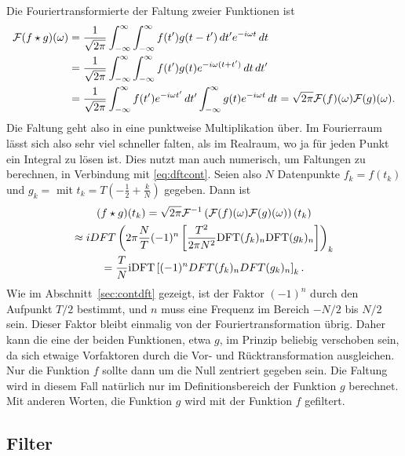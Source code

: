 Die Fouriertransformierte der Faltung zweier Funktionen ist
\begin{equation}
  \label{eq:fourierfaltung}
  \begin{split}
    \mathcal F(f\star g)(\omega) &=
    \frac{1}{\sqrt{2\pi}}\int_{-\infty}^{\infty}
    \int_{-\infty}^{\infty} f(t')g(t-t')\,dt' e^{-i \omega t}\,
    dt\\
    &= \frac{1}{\sqrt{2\pi}}\int_{-\infty}^{\infty}
    \int_{-\infty}^{\infty} f(t') g(t) e^{-i \omega (t+t')}\, dt\,
    dt'\\
    &= \frac{1}{\sqrt{2\pi}} \int_{-\infty}^{\infty} f(t')e^{-i
      \omega t'}\, dt' \int_{-\infty}^{\infty} g(t) e^{-i \omega
      t}\, dt = \sqrt{2\pi}\mathcal F(f)(\omega)\mathcal F(g)(\omega).
  \end{split}
\end{equation}
Die Faltung geht also in eine punktweise Multiplikation über. Im
Fourierraum lässt sich also sehr viel schneller falten, als im
Realraum, wo ja für jeden Punkt ein Integral zu lösen ist. Dies nutzt
man auch numerisch, um Faltungen zu berechnen, in Verbindung mit
\eqref{eq:dftcont}. Seien also $N$ Datenpunkte $f_k = f(t_k)$ und $g_k
= $ mit $t_k = T\left(-\frac{1}{2} + \frac{k}{N}\right)$ gegeben. Dann
ist
\begin{multline}
  \label{eq:discretefold}
  (f\star g)(t_k) =
  \sqrt{2\pi}\mathcal F^{-1}\left(\mathcal F(f)(\omega)\mathcal F(g)(\omega)\right)(t_k)\\
  \approx
  iDFT\left(2\pi \frac{N}{T} (-1)^n
  \left[\frac{T^2}{2\pi N^2}\text{DFT}(f_k)_n\text{DFT}(g_k)_n\right]\right)_k\\
  =
  \frac{T}{N} \text{iDFT}\left[(-1)^n DFT(f_k)_n DFT(g_k)_n\right]_k.
\end{multline}
Wie im Abschnitt~\ref{sec:contdft} gezeigt, ist der Faktor $(-1)^n$
durch den Aufpunkt $T/2$ bestimmt, und $n$ muss eine Frequenz im
Bereich $-N/2$ bis $N/2$ sein. Dieser Faktor bleibt einmalig von der
Fouriertransformation übrig. Daher kann die eine der beiden
Funktionen, etwa $g$, im Prinzip beliebig verschoben sein, da sich
etwaige Vorfaktoren durch die Vor- und Rücktransformation
ausgleichen. Nur die Funktion $f$ sollte dann um die Null zentriert
gegeben sein. Die Faltung wird in diesem Fall natürlich nur im
Definitionsbereich der Funktion $g$ berechnet. Mit anderen Worten, die
Funktion $g$ wird mit der Funktion $f$ gefiltert.

\subsection{Filter}

